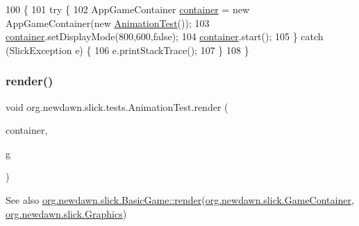 \begin{DoxyCode}
100                                            \{
101         \textcolor{keywordflow}{try} \{
102             AppGameContainer \mbox{\hyperlink{classorg_1_1newdawn_1_1slick_1_1tests_1_1_animation_test_ad2142f4fe5667df82eb8ead44f81e1b1}{container}} = \textcolor{keyword}{new} AppGameContainer(\textcolor{keyword}{new} 
      \mbox{\hyperlink{classorg_1_1newdawn_1_1slick_1_1tests_1_1_animation_test_a8cf7ef8e4d51a272a677c3b8a8954f8a}{AnimationTest}}());
103             \mbox{\hyperlink{classorg_1_1newdawn_1_1slick_1_1tests_1_1_animation_test_ad2142f4fe5667df82eb8ead44f81e1b1}{container}}.setDisplayMode(800,600,\textcolor{keyword}{false});
104             \mbox{\hyperlink{classorg_1_1newdawn_1_1slick_1_1tests_1_1_animation_test_ad2142f4fe5667df82eb8ead44f81e1b1}{container}}.start();
105         \} \textcolor{keywordflow}{catch} (SlickException e) \{
106             e.printStackTrace();
107         \}
108     \}
\end{DoxyCode}
\mbox{\label{classorg_1_1newdawn_1_1slick_1_1tests_1_1_animation_test_a233fe14eb133525693b64428d37e20ce}} 
\subsubsection{\texorpdfstring{render()}{render()}}
{\footnotesize\ttfamily void org.\+newdawn.\+slick.\+tests.\+Animation\+Test.\+render (\begin{DoxyParamCaption}\item[{\mbox{\hyperlink{classorg_1_1newdawn_1_1slick_1_1_game_container}{Game\+Container}}}]{container,  }\item[{\mbox{\hyperlink{classorg_1_1newdawn_1_1slick_1_1_graphics}{Graphics}}}]{g }\end{DoxyParamCaption})\hspace{0.3cm}{\ttfamily [inline]}}

\begin{DoxySeeAlso}{See also}
\mbox{\hyperlink{interfaceorg_1_1newdawn_1_1slick_1_1_game_af1a4670d43eb3ba04dfcf55ab1975b64}{org.\+newdawn.\+slick.\+Basic\+Game\+::render}}(\mbox{\hyperlink{classorg_1_1newdawn_1_1slick_1_1_game_container}{org.\+newdawn.\+slick.\+Game\+Container}}, \mbox{\hyperlink{classorg_1_1newdawn_1_1slick_1_1_graphics}{org.\+newdawn.\+slick.\+Graphics}}) 
\end{DoxySeeAlso}


